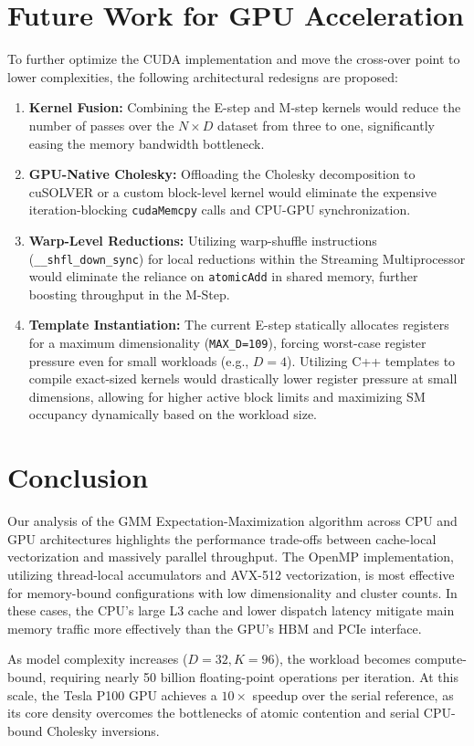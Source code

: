 \documentclass[10pt]{article}
\begin{document}
\section{Future Work for GPU Acceleration}
To further optimize the CUDA implementation and move the cross-over point to lower complexities, the following architectural redesigns are proposed:
\begin{enumerate}
    \item \textbf{Kernel Fusion:} Combining the E-step and M-step kernels would reduce the number of passes over the $N \times D$ dataset from three to one, significantly easing the memory bandwidth bottleneck.
    \item \textbf{GPU-Native Cholesky:} Offloading the Cholesky decomposition to cuSOLVER or a custom block-level kernel would eliminate the expensive iteration-blocking \texttt{cudaMemcpy} calls and CPU-GPU synchronization.
    \item \textbf{Warp-Level Reductions:} Utilizing warp-shuffle instructions (\texttt{\_\_shfl\_down\_sync}) for local reductions within the Streaming Multiprocessor would eliminate the reliance on \texttt{atomicAdd} in shared memory, further boosting throughput in the M-Step.
    \item \textbf{Template Instantiation:} The current E-step statically allocates registers for a maximum dimensionality (\texttt{MAX\_D=109}), forcing worst-case register pressure even for small workloads (e.g., $D=4$). Utilizing C++ templates to compile exact-sized kernels would drastically lower register pressure at small dimensions, allowing for higher active block limits and maximizing SM occupancy dynamically based on the workload size.
\end{enumerate}

\section{Conclusion}
Our analysis of the GMM Expectation-Maximization algorithm across CPU and GPU architectures highlights the performance trade-offs between cache-local vectorization and massively parallel throughput. The OpenMP implementation, utilizing thread-local accumulators and AVX-512 vectorization, is most effective for memory-bound configurations with low dimensionality and cluster counts. In these cases, the CPU's large L3 cache and lower dispatch latency mitigate main memory traffic more effectively than the GPU's HBM and PCIe interface.

As model complexity increases ($D=32, K=96$), the workload becomes compute-bound, requiring nearly 50 billion floating-point operations per iteration. At this scale, the Tesla P100 GPU achieves a $10\times$ speedup over the serial reference, as its core density overcomes the bottlenecks of atomic contention and serial CPU-bound Cholesky inversions.
\end{document}
